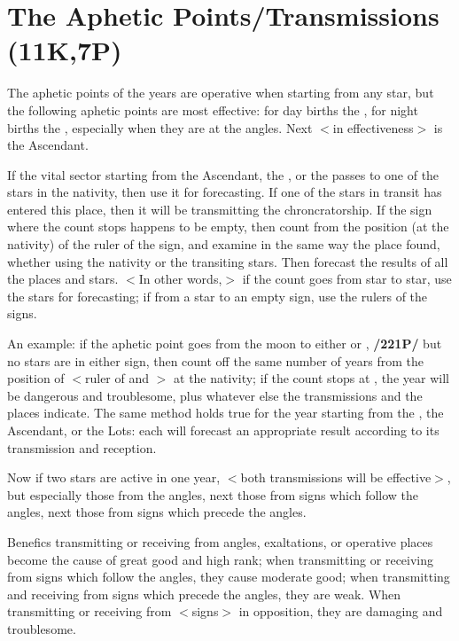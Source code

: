 \section{The Aphetic Points/Transmissions (11K,7P)}

The aphetic points of the years are operative when starting from any star, but the following aphetic points are most effective: for day births the \Sun, for night births the \Moon, especially when they are at the
angles. Next $<$in effectiveness$>$ is the Ascendant. 

If the vital sector starting from the Ascendant, the \Moon, or the \Sun\xspace passes to one of the stars in the nativity, then use it for forecasting. If one of the stars in transit has entered this place, then it will be transmitting the chroncratorship. If the sign where the count stops happens to be empty, then count from the position (at the nativity) of the ruler of the sign, and examine in the same way the place found, whether using the nativity or the transiting stars. Then forecast the results of all the places and stars. $<$In other words,$>$ if the count goes from star to star, use the stars for forecasting; if
from a star to an empty sign, use the rulers of the signs.

An example: if the aphetic point goes from the moon to either \Aries\xspace or \Scorpio, \textbf{/221P/} but no stars are
in either sign, then count off the same number of years from the position of \Mars\xspace $<$ruler of \Aries\xspace and \Scorpio$>$ at the nativity; if the count stops at \Saturn, the year will be dangerous and troublesome, plus whatever else the transmissions and the places indicate. The same method holds true for the year starting from the \Sun, the Ascendant, or the Lots: each will forecast an appropriate result according to its transmission and reception.

Now if two stars are active in one year, $<$both transmissions will be effective$>$, but especially those from the angles, next those from signs which follow the angles, next those from signs which precede the angles. 

Benefics transmitting or receiving from angles, exaltations, or operative places become the cause of great good and high rank; when transmitting or receiving from signs which follow the angles, they cause moderate good; when transmitting and receiving from signs which precede the angles, they are weak. When transmitting or receiving from $<$signs$>$ in opposition, they are damaging and troublesome. 

